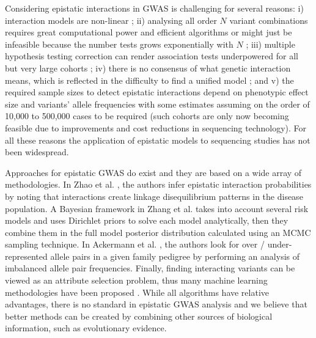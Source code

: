 Considering epistatic interactions in GWAS is challenging for several reasons: 
i) interaction models are non-linear \cite{gao2010classification}; 
ii) analysing all order $N$ variant combinations requires great computational power and efficient algorithms or might just be infeasible because the number tests grows exponentially with $N$ \cite{phillips2008epistasis}; 
iii) multiple hypothesis testing correction can render association tests underpowered for all but very large cohorts \cite{gao2010classification, phillips2008epistasis};
iv) there is no consensus of what genetic interaction means, which is reflected in the difficulty to find a unified model \cite{phillips2008epistasis,mani2008defining}; and 
v) the required sample sizes to detect epistatic interactions depend on phenotypic effect size and variants' allele frequencies with some estimates assuming on the order of 10,000 to 500,000 cases \cite{jostins2013using} to be required (such cohorts are only now becoming feasible due to improvements and cost reductions in sequencing technology).
For all these reasons the application of epistatic models to sequencing studies has not been widespread.

Approaches for epistatic GWAS do exist and they are based on a wide array of methodologies. 
In Zhao et al. \cite{zhao2006test}, the authors infer epistatic interaction probabilities by noting that interactions create linkage disequilibrium patterns in the disease population. 
A Bayesian framework in Zhang et al. \cite{zhang2007bayesian} takes into account several risk models and uses Dirichlet priors to solve each model analytically, then they combine them in the full model posterior distribution calculated using an MCMC sampling technique. 
In Ackermann et al. \cite{ackermann2012systematic}, the authors look for over / under-represented allele pairs in a given family pedigree by performing an analysis of imbalanced allele pair frequencies.
Finally, finding interacting variants can be viewed as an attribute selection problem, thus many machine learning methodologies have been proposed \cite{mckinney2006machine}. 
While all algorithms have relative advantages, there is no standard in epistatic GWAS analysis and we believe that better methods can be created by combining other sources of biological information, such as evolutionary evidence.

